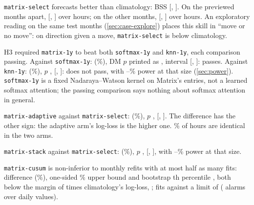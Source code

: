 \documentclass[11pt]{article}
\newcommand{\code}[1]{\texttt{#1}}
\newcommand{\pct}{\%}
\begin{document}
\begin{description}[leftmargin=0pt, style=sameline]
\item[H2 holds.] \code{matrix-select} forecasts better than climatology: BSS \NumHtwoBSS{}
  [\NumHtwoBSSlo, \NumHtwoBSShi]. On the previewed months apart, \NumHtwoPrevBSS{}
  [\NumHtwoPrevLo, \NumHtwoPrevHi] over \NumHtwoPrevHours{} hours; on the other \NumRestMonths{}
  months, \NumHtwoRestBSS{} [\NumHtwoRestLo, \NumHtwoRestHi] over \NumHtwoRestHours{} hours.
  An exploratory reading on the same test months (\cref{sec:case-explore}) places this skill in
  ``move or no move'': on direction given a move, \code{matrix-select} is below climatology.
\item[H3 does not hold.] H3 required \code{matrix-1y} to beat both \code{softmax-1y} and
  \code{knn-1y}, each comparison passing. Against \code{softmax-1y}: \NumHthreeSmDiff{}
  (\NumHthreeSmPct\pct), DM $p$ printed as \NumHthreeSmP, interval [\NumHthreeSmLo, \NumHthreeSmHi]:
  passes. Against \code{knn-1y}: \NumHthreeKnDiff{} (\NumHthreeKnPct\pct), $p$ \NumHthreeKnP,
  [\NumHthreeKnLo, \NumHthreeKnHi]: does not pass, with \NumPowKnObsLo--\NumPowKnObsHi\pct{} power
  at that size (\cref{sec:power}). \code{softmax-1y} is a fixed Nadaraya--Watson kernel on Matrix's
  entries, not a learned softmax attention; the passing comparison says nothing about softmax
  attention in general.
\item[H10 does not hold.] \code{matrix-adaptive} against \code{matrix-select}: \NumHtenDiff{}
  (\NumHtenPct\pct), $p$ \NumHtenP, [\NumHtenLo, \NumHtenHi]. The difference has the other sign: the
  adaptive arm's log-loss is the higher one. \NumHtenIdent\pct{} of hours are identical in the two
  arms.
\item[H11 does not hold.] \code{matrix-stack} against \code{matrix-select}: \NumHelevenDiff{}
  (\NumHelevenPct\pct), $p$ \NumHelevenP, [\NumHelevenLo, \NumHelevenHi], with
  \NumPowElObsLo--\NumPowElObsHi\pct{} power at that size.
\item[H12 holds.] \code{matrix-cusum} is non-inferior to monthly refits with at most half as many
  fits: difference \NumHtwelveDiff{} (\NumHtwelvePct\pct), one-sided \NumConf\pct{} upper bound
  \NumHtwelveUB{} and bootstrap \NumQuantPct th percentile \NumHtwelveQ, both below the margin of
  \NumMarginFactor{} times climatology's log-loss, \NumMargin; \NumHtwelveFits{} fits against a limit
  of \NumHtwelveLimit{} (\NumHtwelveAlarms{} alarms over \NumHtwelveDays{} daily values).
\end{description}
\end{document}
